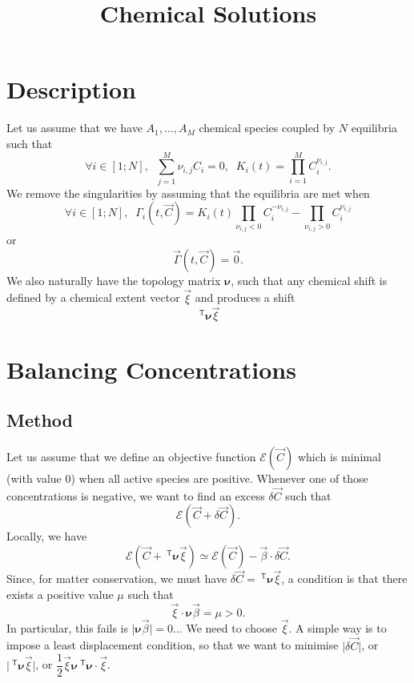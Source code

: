 \documentclass[aps]{revtex4}
\newcommand{\mymat}[1]{\bm{#1}}
\newcommand{\mytrn}[1]{~^{\mathsf{T}}{#1}}
\begin{document}
\title{Chemical Solutions}

\section{Description}
Let us assume that we have $A_1,\ldots,A_M$ chemical species coupled by
$N$ equilibria such that
\begin{equation}
	\forall i \in [1;N], \;\; \sum_{j=1}^{M} \nu_{i,j} C_i = 0, \;\; K_i(t) = \prod_{i=1}^{M} C_i^{\nu_{i,j}}.
\end{equation}
We remove the singularities by assuming that the equilibria are met when
\begin{equation}
	\forall i \in [1;N], \;\; \Gamma_i(t,\vec{C}) = K_i(t) \prod_{\nu_{i,j}<0}  C_i^{-\nu_{i,j}} -  \prod_{\nu_{i,j}>0} C_i^{\nu_{i,j}} 
\end{equation}
or
\begin{equation}
	\vec{\Gamma}(t,\vec{C}) = \vec{0}.
\end{equation}
We also naturally have the topology matrix $\mymat{\nu}$, such that
any chemical shift is defined by a  chemical extent vector $\vec{\xi}$ and
produces a shift
$$
	\mytrn{\mymat{\nu}}\vec{\xi}
$$

\section{Balancing Concentrations}
\subsection{Method}

Let us assume that we define an objective function $\mathcal{E}\left(\vec{C}\right)$ which is minimal (with value 0) when all active species are positive. Whenever one of those concentrations is negative, we want to find an excess
$\delta\vec{C}$ such that
\begin{equation}
	\mathcal{E}\left(\vec{C}+\delta\vec{C}\right).
\end{equation}
Locally, we have
\begin{equation}
	\mathcal{E}\left(\vec{C}+\mytrn{\mymat{\nu}}\vec{\xi}\right) \simeq 
	\mathcal{E}\left(\vec{C}\right) - \vec{\beta}\cdot\delta\vec{C}.
\end{equation}
Since, for matter conservation, we must have $\delta\vec{C} = \mytrn{\mymat{\nu}}\vec{\xi}$, 
a condition is that there exists a positive value $\mu$ such that 
\begin{equation}
	\vec{\xi} \cdot \mymat{\nu} \vec{\beta} = \mu > 0 .
\end{equation}
In particular, this fails is $\vert\mymat{\nu} \vec{\beta}\vert=0$...
We need to choose $\vec{\xi}$. A simple way is to impose a least displacement condition, so
that we want to minimise $\vert\delta\vec{C}\vert$, or $\vert\mytrn{\mymat{\nu}}\vec{\xi}\vert$, or
$\dfrac{1}{2}\vec{\xi}\mymat{\nu}\mytrn{\mymat{\nu}}\cdot\vec{\xi}$.
\end{document}

